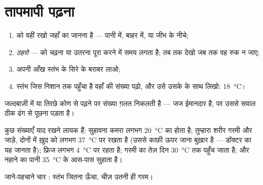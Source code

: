 \section{तापमापी पढ़ना}

\begin{method}[तापमापी पढ़ना]\label{met:g3:temperature-thermometers:read}
\begin{enumerate}
  \item {} को वहीं रखो जहाँ का  जानना है --- पानी में, बाहर
         में, या जीभ के नीचे;
  \item \emph{ठहरो} ---  को चढ़ना या उतरना पूरा करने में समय
        लगता है; तब तक देखो जब तक वह रुक न जाए;
  \item अपनी आँख स्तंभ के सिरे के बराबर लाओ;
  \item स्तंभ जिस निशान तक पहुँचा है वहाँ की संख्या पढ़ो, और उसे
        उसके  के साथ लिखो: \qty{18}{\celsius}।
\end{enumerate}
जल्दबाज़ी में या तिरछे कोण से पढ़ने पर संख्या ग़लत निकलती है --- जज
ईमानदार है, पर उससे सवाल ठीक ढंग से पूछना पड़ता है।
\end{method}

\begin{example}[काम आने वाले ताप]\label{ex:g3:temperature-thermometers:livedby}
कुछ संख्याएँ याद रखने लायक हैं: सुहावना कमरा लगभग
\qty{20}{\celsius} का होता है; तुम्हारा शरीर गरमी और जाड़े, दोनों में
ख़ुद को लगभग \qty{37}{\celsius} पर रखता है (उससे काफ़ी ऊपर जाना
बुख़ार है --- डॉक्टर का  यह जानता है); फ़्रिज लगभग
\qty{4}{\celsius} पर रहता है; गरमी का तेज़ दिन \qty{30}{\celsius} तक
पहुँच जाता है; और नहाने का पानी \qty{35}{\celsius} के आस-पास सुहाता
है।
\end{example}

\begin{omfigure}

{\small जाने-पहचाने चार : स्तंभ जितना ऊँचा, चीज़ उतनी ही गरम।}
\end{omfigure}

